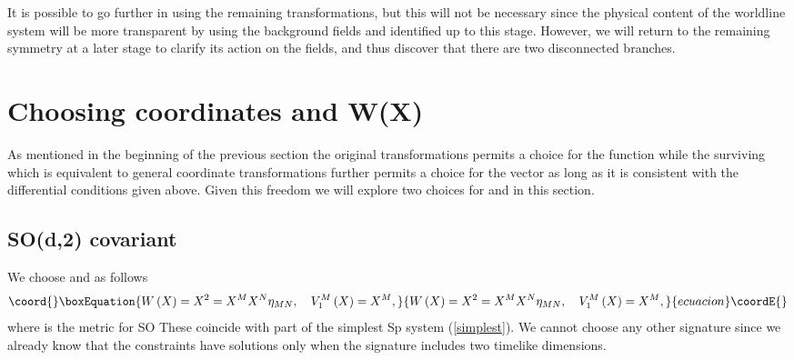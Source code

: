 \documentclass[a4paper,12pt]{article}
\begin{document}
It is possible to go further in using the remaining \coordHE{} transformations, but this will not be necessary since the
physical content of the worldline system will be more transparent by using
the background fields \coordHE{} and \coordHE{} identified up to this stage.
However, we will return to the remaining symmetry at a later stage to
clarify its action on the fields, and thus discover that there are two
disconnected branches.

\section{Choosing coordinates and W(X)}

As mentioned in the beginning of the previous section the original \coordHE{} transformations permits a choice for the
function \coordHE{} while the surviving \coordHE{} which is equivalent to general coordinate
transformations further permits a choice for the vector \coordHE{} as long as it is consistent with the differential conditions
given above. Given this freedom we will explore two choices for \coordHE{} and \coordHE{} in this section.

\subsection{SO(d,2) covariant \coordHE{}}

We choose \coordHE{} and \coordHE{} as follows
\begin{equation}\coord{}\boxEquation{
W\left( X\right) =X^{2}=X^{M}X^{N}\eta _{MN},\quad V_{1}^{M}\left( X\right)
=X^{M},  \label{wx2}
}{
W\left( X\right) =X^{2}=X^{M}X^{N}\eta _{MN},\quad V_{1}^{M}\left( X\right)
=X^{M},  }{ecuacion}\coordE{}\end{equation}
where \coordHE{} is the metric for SO\coordHE{} These coincide
with part of the simplest Sp\myHighlight{$\left( 2\right) $}\coordHE{} system (\ref{simplest}). We
cannot choose any other signature \coordHE{} since we already know that
the constraints \coordHE{} have solutions only when the
signature includes two timelike dimensions.
\end{document}
